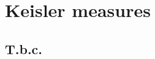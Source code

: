\documentclass[creche.tex]{subfiles}
\begin{document}
\chapter{Keisler measures}
\label{measures}

\def\medrel#1{\parbox[t]{5ex}{$\displaystyle\hfil #1$}}
\def\ceq#1#2#3{\parbox[t]{18ex}{$\displaystyle #1$}\medrel{#2}{$\displaystyle #3$}}

\section{T.b.c.}
\end{document}
